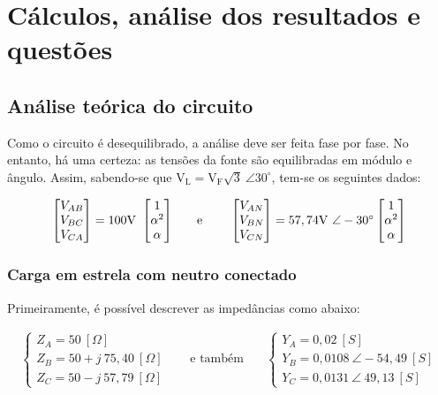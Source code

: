 \documentclass[a4paper,12pt,oneside,openany,table,xcdraw]{article}
\begin{document}
\section{Cálculos, análise dos resultados e questões} %

\subsection{Análise teórica do circuito}
Como o circuito é desequilibrado, a análise deve ser feita fase por fase. No entanto, há uma certeza: as tensões da fonte são equilibradas em módulo e ângulo. Assim, sabendo-se que $\mathrm{V_{L} =V_{F}\sqrt{3} \ \angle 30^{\circ }}$, tem-se os seguintes dados:

\vspace{-0.35cm}
\begin{equation*}
\begin{array}{ c c c }
\mathrm{\begin{bmatrix}
V_{AB}\\
V_{BC}\\
V_{CA}
\end{bmatrix} =100V\ \begin{bmatrix}
1\\
\alpha ^{2}\\
\alpha 
\end{bmatrix}} & \quad \text{e} \quad \  & \mathrm{\begin{bmatrix}
V_{AN}\\
V_{BN}\\
V_{CN}
\end{bmatrix} =57,74V\ \angle -30^{\circ } \begin{bmatrix}
1\\
\alpha ^{2}\\
\alpha 
\end{bmatrix}}
\end{array}
\end{equation*}


\subsubsection{Carga em estrela com neutro conectado} \label{m1:teoria}
Primeiramente, é possível descrever as impedâncias como abaixo:

\vspace{-0.3cm}
\begin{equation*}
\begin{aligned}
\begin{cases}
Z_{A} =50\ [ \Omega ]\\
Z_{B} =50+j\ 75,40\ [ \Omega ]\\
Z_{C} =50-j\ 57,79\ [ \Omega ]
\end{cases} & \quad \text{e também} \quad  & \begin{cases}
Y_{A} =0,02\ [ S]\\
Y_{B} =0,0108\ \angle -54,49\ [ S]\\
Y_{C} =0,0131\ \angle \ 49,13\ [ S]
\end{cases}
\end{aligned}
\end{equation*}
\end{document}
